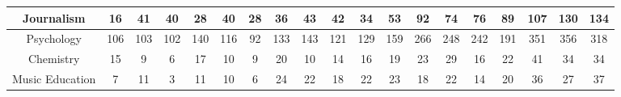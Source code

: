 \documentclass[10pt]{article}
\begin{document}
\begin{landscape}
\begin{longtable}[c]{|ccccccccccccccccccc|}
	\multicolumn{1}{|c|}{Journalism}                                 & \multicolumn{1}{c|}{16}         & \multicolumn{1}{c|}{41}         & \multicolumn{1}{c|}{40}         & \multicolumn{1}{c|}{28}         & \multicolumn{1}{c|}{40}         & \multicolumn{1}{c|}{28}         & \multicolumn{1}{c|}{36}         & \multicolumn{1}{c|}{43}         & \multicolumn{1}{c|}{42}         & \multicolumn{1}{c|}{34}         & \multicolumn{1}{c|}{53}         & \multicolumn{1}{c|}{92}         & \multicolumn{1}{c|}{74}         & \multicolumn{1}{c|}{76}         & \multicolumn{1}{c|}{89}         & \multicolumn{1}{c|}{107}        & \multicolumn{1}{c|}{130}        & 134        \\ \hline
	\multicolumn{1}{|c|}{Psychology}                                 & \multicolumn{1}{c|}{106}        & \multicolumn{1}{c|}{103}        & \multicolumn{1}{c|}{102}        & \multicolumn{1}{c|}{140}        & \multicolumn{1}{c|}{116}        & \multicolumn{1}{c|}{92}         & \multicolumn{1}{c|}{133}        & \multicolumn{1}{c|}{143}        & \multicolumn{1}{c|}{121}        & \multicolumn{1}{c|}{129}        & \multicolumn{1}{c|}{159}        & \multicolumn{1}{c|}{266}        & \multicolumn{1}{c|}{248}        & \multicolumn{1}{c|}{242}        & \multicolumn{1}{c|}{191}        & \multicolumn{1}{c|}{351}        & \multicolumn{1}{c|}{356}        & 318        \\ \hline
	\multicolumn{1}{|c|}{Chemistry}                                  & \multicolumn{1}{c|}{15}         & \multicolumn{1}{c|}{9}          & \multicolumn{1}{c|}{6}          & \multicolumn{1}{c|}{17}         & \multicolumn{1}{c|}{10}         & \multicolumn{1}{c|}{9}          & \multicolumn{1}{c|}{20}         & \multicolumn{1}{c|}{10}         & \multicolumn{1}{c|}{14}         & \multicolumn{1}{c|}{16}         & \multicolumn{1}{c|}{19}         & \multicolumn{1}{c|}{23}         & \multicolumn{1}{c|}{29}         & \multicolumn{1}{c|}{16}         & \multicolumn{1}{c|}{22}         & \multicolumn{1}{c|}{41}         & \multicolumn{1}{c|}{34}         & 34         \\ \hline
	\multicolumn{1}{|c|}{Music Education}                            & \multicolumn{1}{c|}{7}          & \multicolumn{1}{c|}{11}         & \multicolumn{1}{c|}{3}          & \multicolumn{1}{c|}{11}         & \multicolumn{1}{c|}{10}         & \multicolumn{1}{c|}{6}          & \multicolumn{1}{c|}{24}         & \multicolumn{1}{c|}{22}         & \multicolumn{1}{c|}{18}         & \multicolumn{1}{c|}{22}         & \multicolumn{1}{c|}{23}         & \multicolumn{1}{c|}{18}         & \multicolumn{1}{c|}{22}         & \multicolumn{1}{c|}{14}         & \multicolumn{1}{c|}{20}         & \multicolumn{1}{c|}{36}         & \multicolumn{1}{c|}{27}         & 37         \\ \hline

\end{longtable}
\end{landscape}
\end{document}
